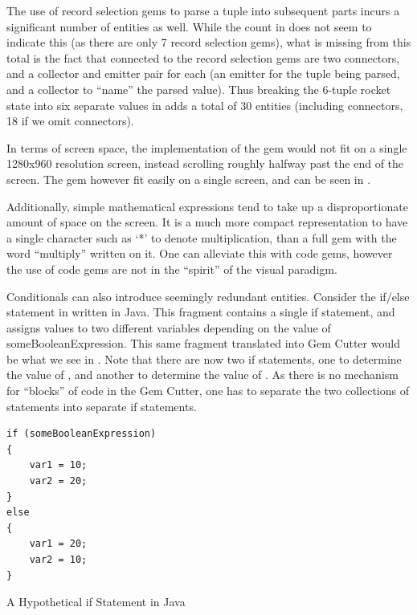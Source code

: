 The use of record selection gems to parse a tuple into subsequent parts incurs a significant number of entities as well.  While the count in  does not seem to indicate this (as there are only 7 record selection gems), what is missing from this total is the fact that connected to the record selection gems are two connectors, and a collector and emitter pair for each (an emitter for the tuple being parsed, and a collector to ``name'' the parsed value).  Thus breaking the 6-tuple rocket state into six separate values in  adds a total of 30 entities (including connectors, 18 if we omit connectors).

In terms of screen space, the implementation of the  gem would not fit on a single 1280x960 resolution screen, instead scrolling roughly halfway past the end of the screen.  The  gem however fit easily on a single screen, and can be seen in .


Additionally, simple mathematical expressions tend to take up a disproportionate amount of space on the screen.  It is a much more compact representation to have a single character such as `*' to denote multiplication, than a full gem with the word ``multiply'' written on it.  One can alleviate this with code gems, however the use of code gems are not in the ``spirit'' of the visual paradigm.

Conditionals can also introduce seemingly redundant entities.  Consider the if/else statement in  written in Java.  This fragment contains a single if statement, and assigns values to two different variables depending on the value of someBooleanExpression.  This same fragment translated into Gem Cutter would be what we see in .  Note that there are now two if statements, one to determine the value of , and another to determine the value of .  As there is no mechanism for ``blocks'' of code in the Gem Cutter, one has to separate the two collections of statements into separate if statements.

\begin{program}
\begin{verbatim}
if (someBooleanExpression)
{
	var1 = 10;
	var2 = 20;
}
else
{
	var1 = 20;
	var2 = 10;
}
\end{verbatim}
\caption{A Hypothetical if Statement in Java}
\label{prog:javaIf}
\end{program}

